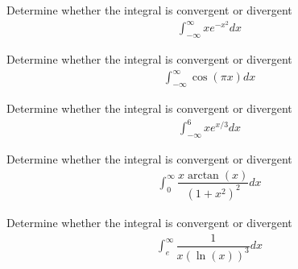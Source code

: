 \begin{exercise}
Determine whether the integral is convergent or divergent
\begin{align*}
    \int_{-\infty}^{\infty} xe^{-x^{2}} dx
\end{align*}
\end{exercise}

\begin{exercise}
Determine whether the integral is convergent or divergent
\begin{align*}
    \int_{-\infty}^{\infty} \cos(\pi x) dx
\end{align*}
\end{exercise}

\begin{exercise}
Determine whether the integral is convergent or divergent
\begin{align*}
    \int_{-\infty}^{6} xe^{x/3} dx
\end{align*}
\end{exercise}

\begin{exercise}
Determine whether the integral is convergent or divergent
\begin{align*}
    \int_{0}^{\infty} \dfrac{x \arctan(x)}{(1+x^{2})^{2}}dx
\end{align*}
\end{exercise}

\begin{exercise}
Determine whether the integral is convergent or divergent
\begin{align*}
    \int_{e}^{\infty} \dfrac{1}{x (\ln(x))^{3}}dx
\end{align*}
\end{exercise}